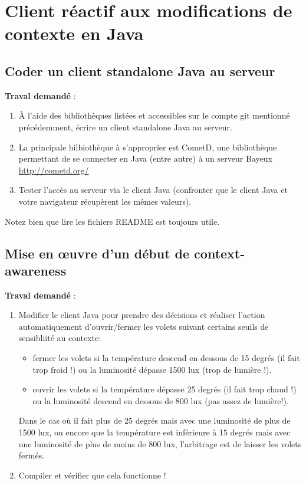 \documentclass[a4paper,11pt,fleqn]{article}
\begin{document}
\section{Client réactif aux modifications de contexte en Java}\label{sec:coding}


\subsection{Coder un client standalone Java au serveur}

\textbf{Traval demandé} :
\begin{enumerate}
\item \`{A} l'aide des bibliothèques listées et accessibles sur le compte git mentionné précédemment, écrire un client standalone Java au serveur.
\item La principale bilbiothèque à s'approprier est CometD, une bibliothèque permettant de se connecter en Java (entre autre) à un serveur Bayeux \url{http://cometd.org/}
\item Tester l'accès au serveur via le client Java (confronter que le client Java et votre navigateur récupèrent les mêmes valeurs).
\end{enumerate}
Notez bien que lire les fichiers README est toujours utile.

\subsection{Mise en \oe{}uvre d'un début de context-awareness}

\textbf{Traval demandé} :
\begin{enumerate}
 \item Modifier le client Java pour prendre des décisions et réaliser l'action automatiquement d'ouvrir/fermer les volets suivant certains seuils de sensibliité au contexte:
	\begin{itemize}
		\item fermer les volets si la température descend en dessous de 15 degrés  (il fait trop froid !) ou la luminosité dépasse 1500 lux (trop de lumière !).
		\item ouvrir les volets si la température dépasse 25 degrés (il fait trop chaud !) ou la luminosité descend en dessous de 800 lux (pas assez de lumière!).
	\end{itemize}
Dans le cas où il fait plus de 25 degrés mais avec une luminosité de plus de 1500 lux, ou encore que la température est inférieure à 15 degrés mais avec une luminosité de plus de moins de 800 lux, l'arbitrage est de laisser les volets fermés.
\item Compiler et vérifier que cela fonctionne !
\end{enumerate}
\end{document}
